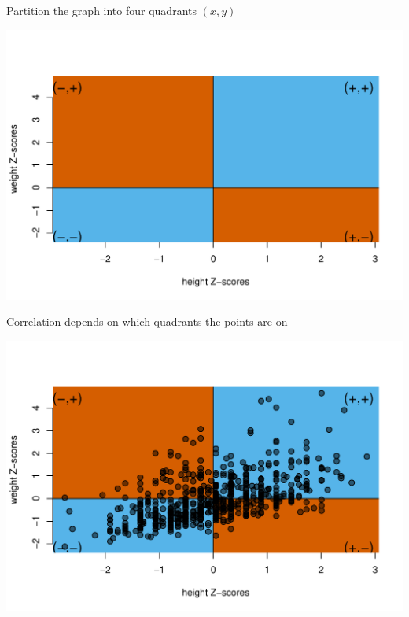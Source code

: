 \documentclass[10pt]{beamer}\usepackage[]{graphicx}\usepackage[]{color}
\makeatletter
\def\maxwidth{ %
  \ifdim\Gin@nat@width>\linewidth
    \linewidth
  \else
    \Gin@nat@width
  \fi
}
\newenvironment{knitrout}{}{} %
\makeatother
\begin{document}
\begin{frame}[fragile]{Partition the graph into four quadrants $(x,y)$}
	
\begin{knitrout}\tiny
{}\color{fgcolor}

{\centering \includegraphics[width=\maxwidth]{figure/unnamed-chunk-3-1} 

}



\end{knitrout}
	
\end{frame}


\begin{frame}[fragile]{Correlation depends on which quadrants the points are on}
	
\begin{knitrout}\tiny
{}\color{fgcolor}

{\centering \includegraphics[width=\maxwidth]{figure/unnamed-chunk-4-1} 

}



\end{knitrout}
	
\end{frame}
\end{document}
